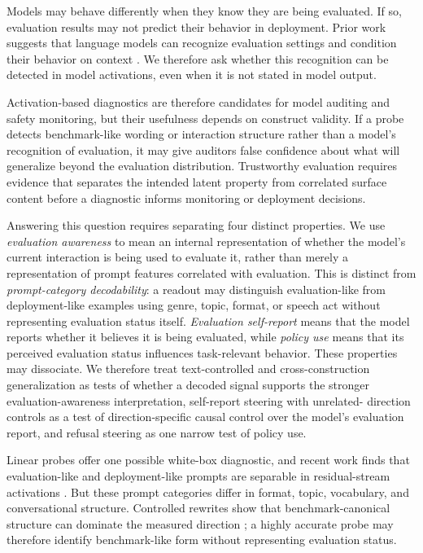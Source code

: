 \documentclass{article}
\begin{document}
Models may behave differently when they know they are being evaluated. If so,
evaluation results may not predict their behavior in deployment. Prior work
suggests that language models can recognize evaluation settings and condition
their behavior on context
\citep{laine2024sad,needham2025know,greenblatt2024alignment}. We therefore ask
whether this recognition can be detected in model activations, even when it is
not stated in model output.

Activation-based diagnostics are therefore candidates for model auditing and
safety monitoring, but their usefulness depends on construct validity. If a
probe detects benchmark-like wording or interaction structure rather than a
model's recognition of evaluation, it may give auditors false confidence about
what will generalize beyond the evaluation distribution. Trustworthy evaluation
requires evidence that separates the intended latent property from correlated
surface content before a diagnostic informs monitoring or deployment decisions.

Answering this question requires separating four distinct properties. We use
\emph{evaluation awareness} to mean an internal
representation of whether the model's current interaction is being used to
evaluate it, rather than merely a representation of prompt features correlated
with evaluation. This is distinct from \emph{prompt-category decodability}: a
readout may distinguish evaluation-like from deployment-like examples using
genre, topic, format, or speech act without representing evaluation status
itself. \emph{Evaluation self-report} means that the model reports whether it
believes it is being evaluated, while \emph{policy use} means that its perceived
evaluation status influences task-relevant behavior. These properties may
dissociate. We therefore treat text-controlled and cross-construction
generalization as tests of whether a decoded signal supports the stronger
evaluation-awareness interpretation, self-report steering with unrelated-
direction controls as a test of direction-specific causal control over the
model's evaluation report, and refusal steering as one narrow test of policy
use.

Linear probes offer one possible white-box diagnostic, and recent work finds
that evaluation-like and deployment-like prompts are separable in residual-stream
activations \citep{nguyen2025probing}. But these prompt categories differ in
format, topic, vocabulary, and conversational structure. Controlled
rewrites show that benchmark-canonical structure can dominate the measured
direction \citep{devbunova2026format}; a highly accurate probe may therefore
identify benchmark-like form without representing evaluation status.
\end{document}

